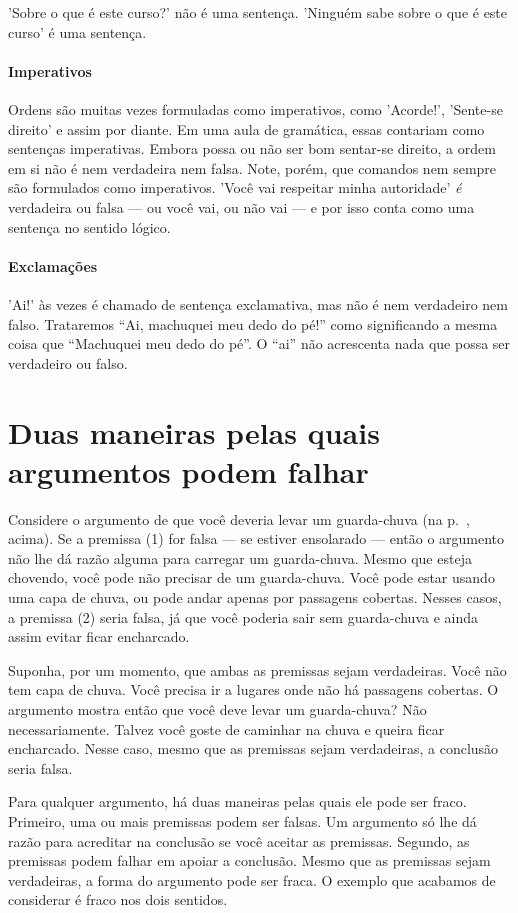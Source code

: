 'Sobre o que é este curso?' não é uma sentença. 'Ninguém sabe sobre o que é este curso' é uma sentença.

\paragraph{Imperativos} Ordens são muitas vezes formuladas como imperativos, como 'Acorde!', 'Sente-se direito' e assim por diante. Em uma aula de gramática, essas contariam como sentenças imperativas. Embora possa ou não ser bom sentar-se direito, a ordem em si não é nem verdadeira nem falsa. Note, porém, que comandos nem sempre são formulados como imperativos. 'Você vai respeitar minha autoridade' \emph{é} verdadeira ou falsa — ou você vai, ou não vai — e por isso conta como uma sentença no sentido lógico.

\paragraph{Exclamações} 'Ai!' às vezes é chamado de sentença exclamativa, mas não é nem verdadeiro nem falso. Trataremos ``Ai, machuquei meu dedo do pé!'' como significando a mesma coisa que ``Machuquei meu dedo do pé''. O ``ai'' não acrescenta nada que possa ser verdadeiro ou falso.

\section{Duas maneiras pelas quais argumentos podem falhar}
Considere o argumento de que você deveria levar um guarda-chuva (na p.~\pageref{argRaining}, acima). Se a premissa (1) for falsa — se estiver ensolarado — então o argumento não lhe dá razão alguma para carregar um guarda-chuva. Mesmo que esteja chovendo, você pode não precisar de um guarda-chuva. Você pode estar usando uma capa de chuva, ou pode andar apenas por passagens cobertas. Nesses casos, a premissa (2) seria falsa, já que você poderia sair sem guarda-chuva e ainda assim evitar ficar encharcado.

Suponha, por um momento, que ambas as premissas sejam verdadeiras. Você não tem capa de chuva. Você precisa ir a lugares onde não há passagens cobertas. O argumento mostra então que você deve levar um guarda-chuva? Não necessariamente. Talvez você goste de caminhar na chuva e queira ficar encharcado. Nesse caso, mesmo que as premissas sejam verdadeiras, a conclusão seria falsa.

Para qualquer argumento, há duas maneiras pelas quais ele pode ser fraco. Primeiro, uma ou mais premissas podem ser falsas. Um argumento só lhe dá razão para acreditar na conclusão se você aceitar as premissas. Segundo, as premissas podem falhar em apoiar a conclusão. Mesmo que as premissas sejam verdadeiras, a forma do argumento pode ser fraca. O exemplo que acabamos de considerar é fraco nos dois sentidos.

